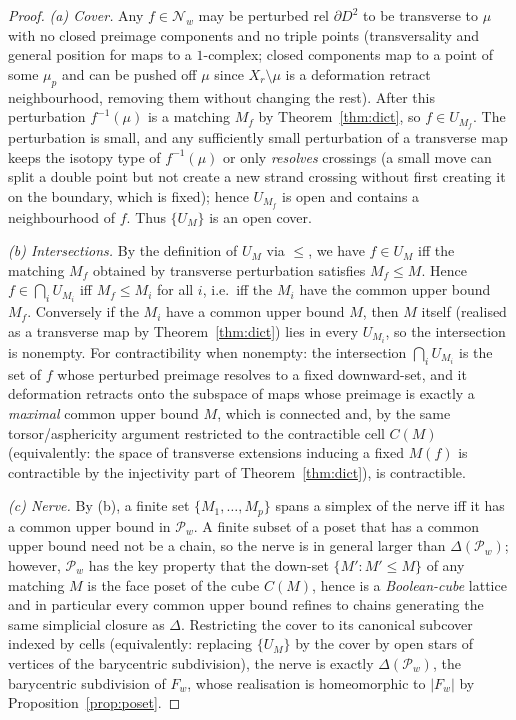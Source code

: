 \documentclass[11pt]{article}
\theoremstyle{definition}
\theoremstyle{remark}
\newcommand{\bdy}{\partial}
\newcommand{\rose}{X_r}
\begin{document}
\begin{proof}
\emph{(a) Cover.} Any $f\in\mathcal N_w$ may be perturbed rel $\bdy D^2$ to be
transverse to $\mu$ with no closed preimage components and no triple points
(transversality and general position for maps to a $1$-complex; closed
components map to a point of some $\mu_p$ and can be pushed off $\mu$ since
$\rose\setminus\mu$ is a deformation retract neighbourhood, removing them without
changing the rest). After this perturbation $f^{-1}(\mu)$ is a matching $M_f$ by
Theorem~\ref{thm:dict}, so $f\in U_{M_f}$. The perturbation is small, and any
sufficiently small perturbation of a transverse map keeps the isotopy type of
$f^{-1}(\mu)$ or only \emph{resolves} crossings (a small move can split a double
point but not create a new strand crossing without first creating it on the
boundary, which is fixed); hence $U_{M_f}$ is open and contains a neighbourhood
of $f$. Thus $\{U_M\}$ is an open cover.

\emph{(b) Intersections.} By the definition of $U_M$ via $\le$, we have $f\in
U_M$ iff the matching $M_f$ obtained by transverse perturbation satisfies
$M_f\le M$. Hence $f\in\bigcap_i U_{M_i}$ iff $M_f\le M_i$ for all $i$, i.e.\
iff the $M_i$ have the common upper bound $M_f$. Conversely if the $M_i$ have a
common upper bound $M$, then $M$ itself (realised as a transverse map by
Theorem~\ref{thm:dict}) lies in every $U_{M_i}$, so the intersection is nonempty.
For contractibility when nonempty: the intersection $\bigcap_i U_{M_i}$ is the
set of $f$ whose perturbed preimage resolves to a fixed downward-set, and it
deformation retracts onto the subspace of maps whose preimage is exactly a
\emph{maximal} common upper bound $M$, which is connected and, by the same
torsor/asphericity argument restricted to the contractible cell $C(M)$
(equivalently: the space of transverse extensions inducing a fixed $M(f)$ is
contractible by the injectivity part of Theorem~\ref{thm:dict}), is contractible.

\emph{(c) Nerve.} By (b), a finite set $\{M_1,\dots,M_p\}$ spans a simplex of the
nerve iff it has a common upper bound in $\mathcal P_w$. A finite subset of a
poset that has a common upper bound need not be a chain, so the nerve is in
general larger than $\Delta(\mathcal P_w)$; however, $\mathcal P_w$ has the key
property that the down-set $\{M':M'\le M\}$ of any matching $M$ is the face poset
of the cube $C(M)$, hence is a \emph{Boolean-cube} lattice and in particular
every common upper bound refines to chains generating the same simplicial closure
as $\Delta$. Restricting the cover to its canonical subcover indexed by cells
(equivalently: replacing $\{U_M\}$ by the cover by open stars of vertices of the
barycentric subdivision), the nerve is exactly $\Delta(\mathcal P_w)$, the
barycentric subdivision of $F_w$, whose realisation is homeomorphic to $|F_w|$ by
Proposition~\ref{prop:poset}.
\end{proof}
\end{document}
